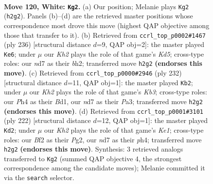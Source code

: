 \documentclass[11pt]{article}
\begin{document}
\clearpage

\begin{figure}[p]\centering
\begin{subfigure}{0.46\textwidth}\centering
\resizebox{\linewidth}{!}{%
\newchessgame
\chessboard[
  setfen={6k1/3n4/8/5P2/p6P/P7/5B1K/8 w - - 7 120},
  showmover=false,
  pgfstyle=straightmove, color=movearrow, markmove={h2-g2}
]}
\caption{}
\end{subfigure}\hfill
\begin{subfigure}{0.46\textwidth}\centering
\resizebox{\linewidth}{!}{%
\newchessgame
\chessboard[
  setfen={8/4B3/7k/3K1p2/7P/5P2/7b/8 w - - 17 119},
  showmover=false,
  pgfstyle=straightmove, color=movearrow, markmove={d5-e6}
]}
\caption{}
\end{subfigure}
\\[4pt]
\begin{subfigure}{0.46\textwidth}\centering
\resizebox{\linewidth}{!}{%
\newchessgame
\chessboard[
  setfen={8/k7/8/8/7p/PK5P/3b2P1/3B4 w - - 67 117},
  showmover=false,
  pgfstyle=straightmove, color=movearrow, markmove={b3-b2}
]}
\caption{}
\end{subfigure}\hfill
\begin{subfigure}{0.46\textwidth}\centering
\resizebox{\linewidth}{!}{%
\newchessgame
\chessboard[
  setfen={2n5/5k2/8/8/7p/7P/6P1/4K3 w - - 0 112},
  showmover=false,
  pgfstyle=straightmove, color=movearrow, markmove={e1-d2}
]}
\caption{}
\end{subfigure}
\caption{\textbf{Move 120, White: \texttt{Kg2}.} (a) Our position; Melanie plays \texttt{Kg2} (\texttt{h2g2}). Panels (b)--(d) are the retrieved master positions whose correspondence most drove this move (highest QAP objective among those that transfer to it). (b) Retrieved from \texttt{ccrl\_top\_p0002\#1467} (ply 236) [structural distance $d$=9, QAP obj=2]: the master played \texttt{Ke6}; under $\mu$ our \emph{Kh2} plays the role of that game's \emph{Kd5}; cross-type roles: our \emph{n}d7 as their \emph{b}h2; transferred move \texttt{h2g2} \textbf{(endorses this move)}. (c) Retrieved from \texttt{ccrl\_top\_p0000\#2946} (ply 232) [structural distance $d$=11, QAP obj=1]: the master played \texttt{Kb2}; under $\mu$ our \emph{Kh2} plays the role of that game's \emph{Kb3}; cross-type roles: our \emph{P}h4 as their \emph{B}d1, our \emph{n}d7 as their \emph{P}a3; transferred move \texttt{h2g2} \textbf{(endorses this move)}. (d) Retrieved from \texttt{ccrl\_top\_p0001\#3101} (ply 222) [structural distance $d$=12, QAP obj=1]: the master played \texttt{Kd2}; under $\mu$ our \emph{Kh2} plays the role of that game's \emph{Ke1}; cross-type roles: our \emph{B}f2 as their \emph{P}g2, our \emph{n}d7 as their \emph{p}h4; transferred move \texttt{h2g2} \textbf{(endorses this move)}. Synthesis: 3 retrieved analogs transferred to \texttt{Kg2} (summed QAP objective 4, the strongest correspondence among the candidate moves); Melanie committed it via the \texttt{search} selector.}
\label{fig:thought-m238}
\end{figure}
\end{document}
